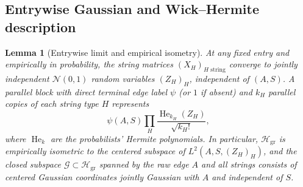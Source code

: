 \documentclass[11pt]{article}
\theoremstyle{plain}
\newtheorem{lemma}[theorem]{Lemma}
\theoremstyle{definition}
\theoremstyle{remark}
\DeclareMathOperator{\He}{He}
\begin{document}
\subsection{Entrywise Gaussian and Wick--Hermite description}

\begin{lemma}[Entrywise limit and empirical isometry]\label{lem:entrywise}
At any fixed entry and empirically in probability, the string matrices $(X_H)_{H \text{ string}}$ converge to jointly independent $\mathcal{N}(0,1)$ random variables $(Z_H)_H$, independent of $(A, S)$.
A parallel block with direct terminal edge label $\psi$ (or $1$ if absent) and $k_H$ parallel copies of each string type $H$ represents
\[
\psi(A, S) \prod_H \frac{\He_{k_H}(Z_H)}{\sqrt{k_H!}},
\]
where $\He_k$ are the probabilists' Hermite polynomials.
In particular, $\mathcal{H}_{\mathrm{gr}}$ is empirically isometric to the centered subspace of $L^2(A, S, (Z_H)_H)$, and the closed subspace $\mathcal{G} \subset \mathcal{H}_{\mathrm{gr}}$ spanned by the raw edge $A$ and all strings consists of centered Gaussian coordinates jointly Gaussian with $A$ and independent of $S$.
\end{lemma}
\end{document}
